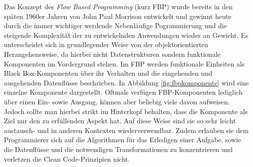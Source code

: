Das Konzept des \textit{Flow Based Programming} (kurz FBP) wurde bereits in den späten 1960er Jahren von John Paul Morrison entwickelt und gewinnt heute durch die immer wichtiger werdende Nebenläufige Pogrammierung und die steigende Komplexität der zu entwickelnden Anwendungen wieder an Gewicht. Es unterscheidet sich in grundlegender Weise von der objektorientierten Herangehensweise, da hierbei nicht Datenstrukturen sondern funktionale Komponenten im Vordergrund stehen. Im FBP werden funktionale Einheiten als Black Box-Komponenten über ihr Verhalten und die eingehenden und ausgehenden Datenflüsse beschrieben. In Abbildung \ref{fig:fbpkomponente} wird eine einzelne Komponente dargestellt. Oftmals verfügen FBP-Komponenten lediglich über einen Ein- sowie Ausgang, können aber beliebig viele davon aufweisen. Jedoch sollte man hierbei strikt im Hinterkopf behalten, dass die Komponente als Ziel nur den zu erfüllenden Aspekt hat. Auf diese Weise sind sie so sehr leicht austausch- und in anderen Kontexten wiederverwendbar. Zudem erlauben sie dem Programmierer sich auf die Algorithmen für das Erledigen einer Aufgabe, sowie die Datenflüsse und die notwendigen Transformationen zu konzentrieren und verletzen die Clean Code-Prinzipien nicht.

